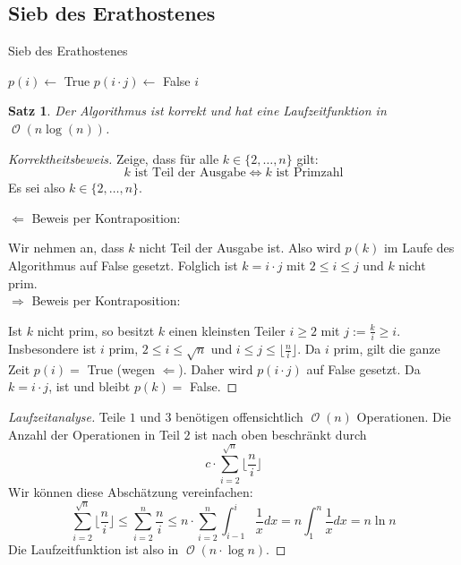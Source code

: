 \documentclass[a4paper,12pt]{article}
\DeclareMathOperator{\BigO}{\mathcal O}
\newtheorem{satz}[axiom]{Satz}
\theoremstyle{definition}
\begin{document}
	\subsection{Sieb des Erathostenes}
	\begin{algorithm}[H]
		\caption{Sieb des Erathostenes}
		\begin{algorithmic}
				\State $p(i) \gets$ True
			\EndFor
						\State $p(i\cdot j) \gets$ False
					\EndFor
				\EndIf
			\EndFor
					\State \Return $i$
				\EndIf
			\EndFor
		\end{algorithmic}
	\end{algorithm}
	\begin{satz}
		Der Algorithmus ist korrekt und hat eine Laufzeitfunktion in $\BigO(n \log(n))$.
	\end{satz}
	\begin{proof}[Korrektheitsbeweis]
		Zeige, dass für alle $k \in \{2,\dots,n\}$ gilt:
		\[
			k \text{ ist Teil der Ausgabe} \Longleftrightarrow k \text{ ist Primzahl}
		\]
		Es sei also $k\in \{2,\dots,n\}$.
		
		$\Longleftarrow$ Beweis per Kontraposition:
		
		Wir nehmen an, dass $k$ nicht Teil der Ausgabe ist. Also wird $p(k)$ im Laufe des Algorithmus auf False gesetzt. Folglich ist $k = i\cdot j$ mit $2\leq i \leq j$ und $k$ nicht prim.\\[2ex]
		
		$\Longrightarrow$ Beweis per Kontraposition:
		
		Ist $k$ nicht prim, so besitzt $k$ einen kleinsten Teiler $i \geq 2$ mit $j := \frac{k}{i}\geq i$. Insbesondere ist $i$ prim, $2 \leq i \leq \sqrt{n}$ und $i \leq j \leq \lfloor\frac{n}{i}\rfloor$. Da $i$ prim, gilt die ganze Zeit $p(i) =$ True (wegen $\Longleftarrow$). Daher wird $p(i\cdot j)$ auf False gesetzt. Da $k = i\cdot j$, ist und bleibt $p(k) =$ False.
	\end{proof}
	\begin{proof}[Laufzeitanalyse]
		Teile $1$ und $3$ benötigen offensichtlich $\BigO(n)$ Operationen. Die Anzahl der Operationen in Teil $2$ ist nach oben beschränkt durch
		\[
			c\cdot \sum_{i=2}^{\sqrt{n}}\Big\lfloor \frac{n}{i} \Big\rfloor
		\]
		Wir können diese Abschätzung vereinfachen:
		\[
			\sum_{i=2}^{\sqrt{n}}\Big\lfloor \frac{n}{i} \Big\rfloor \leq \sum_{i=2}^{n}\frac{n}{i}\leq n\cdot\sum_{i=2}^{n}\int_{i-1}^{i}\frac{1}{x}dx = n\int_{1}^{n}\frac{1}{x}dx = n\ln n
		\]
		Die Laufzeitfunktion ist also in $\BigO(n\cdot \log n)$.
	\end{proof}
\end{document}

